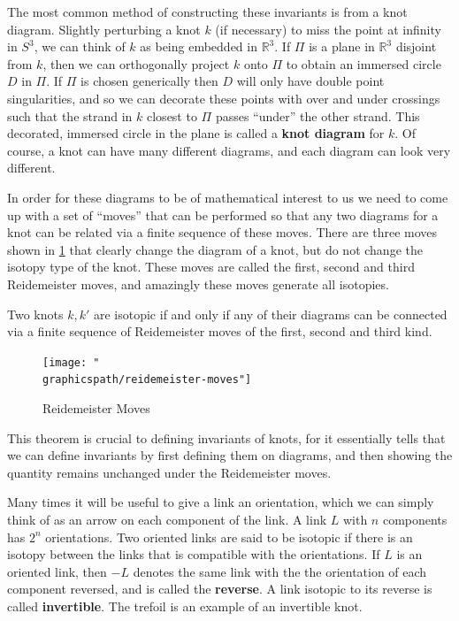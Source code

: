 The most common method of constructing these invariants is from a knot diagram. Slightly perturbing a knot $k$ (if necessary) to miss the point at infinity in $S^3$, we can think of $k$ as being embedded in $\mathbb R^3$. If $\Pi$ is a plane in $\mathbb R^3$ disjoint from $k$, then we can orthogonally project $k$ onto $\Pi$ to obtain an immersed circle $D$ in $\Pi$. If $\Pi$ is chosen generically then $D$ will only have double point singularities, and so we can decorate these points with over and under crossings such that the strand in $k$ closest to $\Pi$ passes ``under'' the other strand. This decorated, immersed circle in the plane is called a \textbf{knot diagram} for $k$. Of course, a knot can have many different diagrams, and each diagram can look very different. 

In order for these diagrams to be of mathematical interest to us we need to come up with a set of ``moves'' that can be performed so that any two diagrams for a knot can be related via a finite sequence of these moves. There are three moves shown in \cref{reidemeister-moves} that clearly change the diagram of a knot, but do not change the isotopy type of the knot. These moves are called the first, second and third Reidemeister moves, and amazingly these moves generate all isotopies.

\begin{thm}
\label{Reidemeister's Theorem}
Two knots $k,k'$ are isotopic if and only if any of their diagrams can be connected via a finite sequence of Reidemeister moves of the first, second and third kind.
\end{thm}

\begin{figure}[tb]
\centering
\texttt{[image: "\\graphicspath/reidemeister-moves"]}
\caption{Reidemeister Moves}
\label{reidemeister-moves}
\end{figure}

This theorem is crucial to defining invariants of knots, for it essentially tells that we can define invariants by first defining them on diagrams, and then showing the quantity remains unchanged under the Reidemeister moves. 

Many times it will be useful to give a link an orientation, which we can simply think of as an arrow on each component of the link. A link $L$ with $n$ components has $2^n$ orientations. Two oriented links are said to be isotopic if there is an isotopy between the links that is compatible with the orientations. If $L$ is an oriented link, then $-L$ denotes the same link with the the orientation of each component reversed, and is called the \textbf{reverse}. A link isotopic to its reverse is called \textbf{invertible}. The trefoil is an example of an invertible knot.

